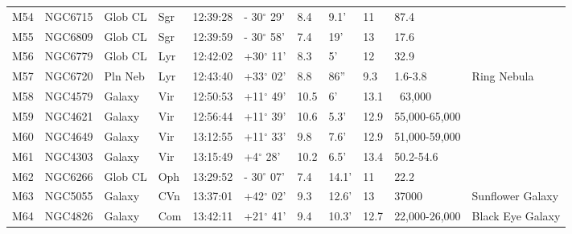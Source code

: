 \begin{longtable}{@{}lllllllllll@{}}
M54        & NGC6715     & Glob CL    & Sgr       & 12:39:28 & - 30$^{\circ}$ 29' & 8.4       & 9.1'                 & 11       & 87.4                &                                           \\
M55        & NGC6809     & Glob CL    & Sgr       & 12:39:59 & - 30$^{\circ}$ 58' & 7.4       & 19'                  & 13       & 17.6                &                                           \\
M56        & NGC6779     & Glob CL    & Lyr       & 12:42:02 & +30$^{\circ}$ 11'  & 8.3       & 5'                   & 12       & 32.9                &                                           \\
M57        & NGC6720     & Pln Neb    & Lyr       & 12:43:40 & +33$^{\circ}$ 02'  & 8.8       & 86''                 & 9.3      & 1.6-3.8             & Ring Nebula                               \\
M58        & NGC4579     & Galaxy     & Vir       & 12:50:53 & +11$^{\circ}$ 49'  & 10.5      & 6'                   & 13.1     & ~63,000             &                                           \\
M59        & NGC4621     & Galaxy     & Vir       & 12:56:44 & +11$^{\circ}$ 39'  & 10.6      & 5.3'                 & 12.9     & 55,000-65,000       &                                           \\
M60        & NGC4649     & Galaxy     & Vir       & 13:12:55 & +11$^{\circ}$ 33'  & 9.8       & 7.6'                 & 12.9     & 51,000-59,000       &                                           \\
M61        & NGC4303     & Galaxy     & Vir       & 13:15:49 & +4$^{\circ}$ 28'   & 10.2      & 6.5'                 & 13.4     & 50.2-54.6           &                                           \\
M62        & NGC6266     & Glob CL    & Oph       & 13:29:52 & - 30$^{\circ}$ 07' & 7.4       & 14.1'                & 11       & 22.2                &                                           \\
M63        & NGC5055     & Galaxy     & CVn       & 13:37:01 & +42$^{\circ}$ 02'  & 9.3       & 12.6'                & 13       & 37000               & Sunflower Galaxy                          \\
M64        & NGC4826     & Galaxy     & Com       & 13:42:11 & +21$^{\circ}$ 41'  & 9.4       & 10.3'                & 12.7     & 22,000-26,000       & Black Eye Galaxy                          \\

\end{longtable}
